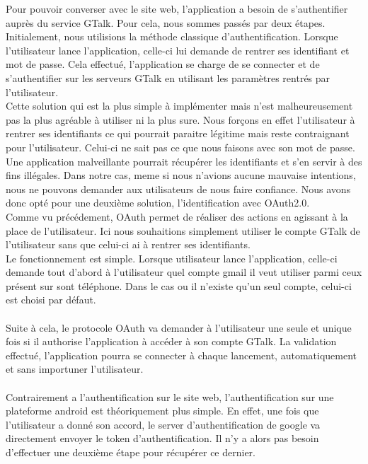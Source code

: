 Pour pouvoir converser avec le site web, l'application a besoin de s'authentifier auprès du service
GTalk. Pour cela, nous sommes passés par deux étapes. 
\\
Initialement, nous utilisions la méthode classique d'authentification. Lorsque l'utilisateur lance 
l'application, celle-ci lui demande de rentrer ses identifiant et mot de passe. Cela effectué, 
l'application se charge de se connecter et de s'authentifier sur les serveurs GTalk en utilisant les
paramètres rentrés par l'utilisateur.
\\
Cette solution qui est la plus simple à implémenter mais n'est malheureusement pas la plus agréable
à utiliser ni la plus sure. Nous forçons en effet l'utilisateur à rentrer ses identifiants ce qui 
pourrait paraitre légitime mais reste contraignant pour l'utilisateur. Celui-ci ne sait pas ce que 
nous faisons avec son mot de passe. Une application malveillante pourrait récupérer les identifiants
et s'en servir à des fins illégales. Dans notre cas, meme si nous n'avions aucune mauvaise intentions,
nous ne pouvons demander aux utilisateurs de nous faire confiance. Nous avons donc opté pour une 
deuxième solution, l'identification avec OAuth2.0.
\\
Comme vu précédement, OAuth permet de réaliser des actions en agissant à la place de l'utilisateur. 
Ici nous souhaitions simplement utiliser le compte GTalk de l'utilisateur sans que celui-ci ai à rentrer
ses identifiants. 
\\
Le fonctionnement est simple. Lorsque utilisateur lance l'application, celle-ci demande tout d'abord
à l'utilisateur quel compte gmail il veut utiliser parmi ceux présent sur sont téléphone. Dans le cas
ou il n'existe qu'un seul compte, celui-ci est choisi par défaut.
\\\\
Suite à cela, le protocole OAuth va demander à l'utilisateur une seule et unique fois si il authorise 
l'application à accéder à son compte GTalk. La validation effectué, l'application pourra se connecter 
à chaque lancement, automatiquement et sans importuner l'utilisateur. 
\\\\
Contrairement a l'authentification sur le site web, l'authentification sur une plateforme android est
théoriquement plus simple. En effet, une fois que l'utilisateur a donné son accord, le server 
d'authentification de google va directement envoyer le token d'authentification. Il n'y a alors pas 
besoin d'effectuer une deuxième étape pour récupérer ce dernier.

